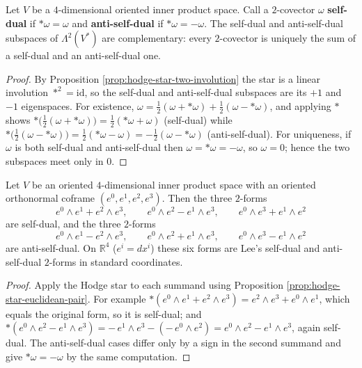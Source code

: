 \begin{proposition}
\label{prop:self-dual-decomposition}
\leanok
{}
Let $V$ be a $4$-dimensional oriented inner product space. Call a $2$-covector $\omega$ \textbf{self-dual} if ${*}\omega = \omega$ and \textbf{anti-self-dual} if ${*}\omega = -\omega$. The self-dual and anti-self-dual subspaces of $\Lambda^2(V^*)$ are complementary: every $2$-covector is uniquely the sum of a self-dual and an anti-self-dual one.
\end{proposition}
\begin{proof}
\leanok
By Proposition \ref{prop:hodge-star-two-involution} the star is a linear involution ${*}^2 = \mathrm{id}$, so the self-dual and anti-self-dual subspaces are its $+1$ and $-1$ eigenspaces. For existence, $\omega = \tfrac12(\omega + {*}\omega) + \tfrac12(\omega - {*}\omega)$, and applying ${*}$ shows ${*}\big(\tfrac12(\omega + {*}\omega)\big) = \tfrac12({*}\omega + \omega)$ (self-dual) while ${*}\big(\tfrac12(\omega - {*}\omega)\big) = \tfrac12({*}\omega - \omega) = -\tfrac12(\omega - {*}\omega)$ (anti-self-dual). For uniqueness, if $\omega$ is both self-dual and anti-self-dual then $\omega = {*}\omega = -\omega$, so $\omega = 0$; hence the two subspaces meet only in $0$.
\end{proof}

\begin{proposition}
\label{prop:self-dual-euclidean}
\leanok
{}
Let $V$ be an oriented $4$-dimensional inner product space with an oriented orthonormal coframe $(e^0,e^1,e^2,e^3)$. Then the three $2$-forms
\[
e^0 \wedge e^1 + e^2 \wedge e^3, \qquad e^0 \wedge e^2 - e^1 \wedge e^3, \qquad e^0 \wedge e^3 + e^1 \wedge e^2
\]
are self-dual, and the three $2$-forms
\[
e^0 \wedge e^1 - e^2 \wedge e^3, \qquad e^0 \wedge e^2 + e^1 \wedge e^3, \qquad e^0 \wedge e^3 - e^1 \wedge e^2
\]
are anti-self-dual. On $\mathbb{R}^4$ ($e^i = dx^i$) these six forms are Lee's self-dual and anti-self-dual $2$-forms in standard coordinates.
\end{proposition}
\begin{proof}
\leanok
{}
Apply the Hodge star to each summand using Proposition \ref{prop:hodge-star-euclidean-pair}. For example ${*}(e^0\wedge e^1 + e^2\wedge e^3) = e^2\wedge e^3 + e^0\wedge e^1$, which equals the original form, so it is self-dual; and ${*}(e^0\wedge e^2 - e^1\wedge e^3) = -\,e^1\wedge e^3 - (-\,e^0\wedge e^2) = e^0\wedge e^2 - e^1\wedge e^3$, again self-dual. The anti-self-dual cases differ only by a sign in the second summand and give ${*}\omega = -\omega$ by the same computation.
\end{proof}

